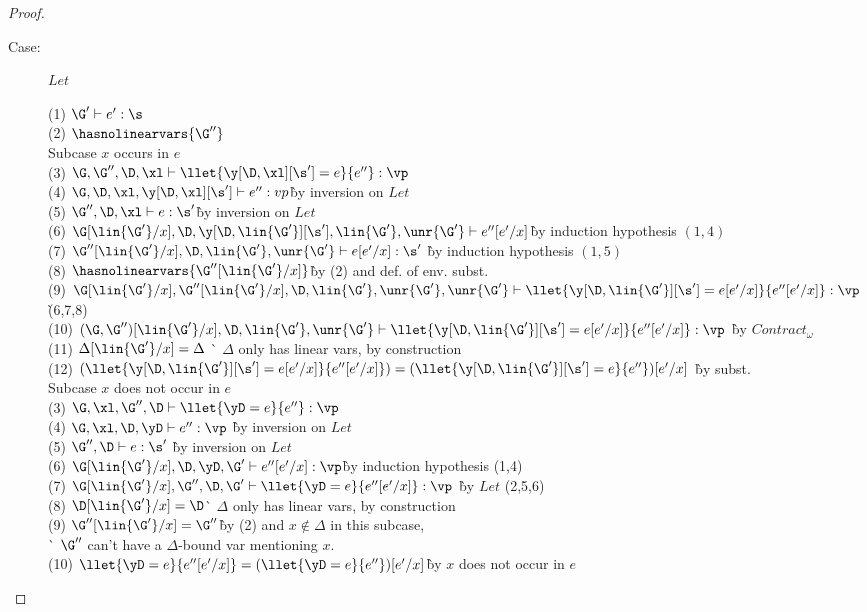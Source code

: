 \begin{proof}
\begin{description}
\item[Case:] $Let$
\begin{tabbing}
  (1) $\G' \vdash e' : \s$\\
  (2) $\hasnolinearvars{\G''}$\\
  Subcase $x$ occurs in $e$\\
  (3) $\G, \G'', \D, \xl \vdash \llet{\y[\D,\xl][\s'] = e}{e''} : \vp$\\
  (4) $\G, \D, \xl, \y[\D,\xl][\s'] \vdash e'' : vp$\` by inversion on $Let$\\
  (5) $\G'', \D, \xl \vdash e : \s'$\` by inversion on $Let$\\
  (6) $\G[\lin{\G'}/x], \D, \y[\D,\lin{\G'}][\s'], \lin{\G'}, \unr{\G'} \vdash
  e''[e'/x]$\` by induction hypothesis $(1,4)$\\
  (7) $\G''[\lin{\G'}/x], \D, \lin{\G'}, \unr{\G'} \vdash e[e'/x] : \s'$ \` by induction hypothesis $(1,5)$\\
  (8) $\hasnolinearvars{\G''[\lin{\G'}/x]}$\` by (2) and def. of env. subst.\\
  (9) $\G[\lin{\G'}/x], \G''[\lin{\G'}/x], \D, \lin{\G'}, \unr{\G'}, \unr{\G'}
  \vdash \llet{\y[\D,\lin{\G'}][\s'] = e[e'/x]}{e''[e'/x]} : \vp$ \` (6,7,8)\\ %
  (10) $(\G, \G'')[\lin{\G'}/x], \D, \lin{\G'}, \unr{\G'} \vdash
  \llet{\y[\D,\lin{\G'}][\s'] = e[e'/x]}{e''[e'/x]} : \vp$ \` by $Contract_\omega$\\
  (11) $\Delta[\lin{\G'}/x] = \Delta$ \` $\Delta$ only has linear vars, by construction\\
  (12) $(\llet{\y[\D,\lin{\G'}][\s'] = e[e'/x]}{e''[e'/x]}) =
  (\llet{\y[\D,\lin{\G'}][\s'] = e}{e''})[e'/x]$ \` by subst.\\
  Subcase $x$ does not occur in $e$\\
  (3) $\G, \xl, \G'', \D \vdash \llet{\yD = e}{e''} : \vp$\\
  (4) $\G, \xl, \D, \yD \vdash e'' : \vp$ \` by inversion on $Let$\\
  (5) $\G'', \D \vdash e : \s'$ \` by inversion on $Let$\\
  (6) $\G[\lin{\G'}/x], \D, \yD, \G' \vdash e''[e'/x] : \vp$\` by induction hypothesis (1,4)\\
  (7) $\G[\lin{\G'}/x], \G'', \D, \G' \vdash \llet{\yD = e}{e''[e'/x]} : \vp$ \`
  by $Let$ (2,5,6)\\
  (8) $\D[\lin{\G'}/x] = \D$\` $\Delta$ only has linear vars, by
  construction\\
  (9) $\G''[\lin{\G'}/x] = \G''$\` by (2) and $x \notin \Delta$ in this
  subcase,\\
  \` $\G''$ can't have a $\Delta$-bound var mentioning $x$.\\
  (10) $\llet{\yD = e}{e''[e'/x]} = (\llet{\yD = e}{e''})[e'/x]$\` by $x$ does
  not occur in $e$\\
\end{tabbing}


\end{description}
\end{proof}
